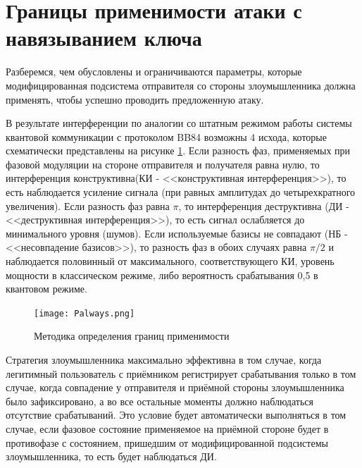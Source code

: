 \section{Границы применимости атаки с навязыванием ключа} \label{ch:ch3/sec2}

Разберемся, чем обусловлены и ограничиваются параметры, которые модифицированная подсистема отправителя со стороны злоумышленника должна применять, чтобы успешно проводить предложенную атаку. 

В результате интерференции по аналогии со штатным режимом работы системы квантовой коммуникации с протоколом BB84 возможны 4 исхода, которые схематически представлены на рисунке \ref{fig:Palways}. Если разность фаз, применяемых при фазовой модуляции на стороне отправителя и получателя равна нулю, то интерференция конструктивна(КИ - <<конструктивная интерференция>>), то есть наблюдается усиление сигнала (при равных амплитудах  до четырехкратного увеличения). Если разность фаз равна $\pi$, то интерференция деструктивна (ДИ - <<деструктивная интерференция>>), то есть сигнал ослабляется до минимального уровня (шумов). Если используемые базисы не совпадают (НБ - <<несовпадение базисов>>), то разность фаз в обоих случаях равна $\pi/2$ и наблюдается половинный от максимального, соответствующего КИ, уровень мощности в классическом режиме, либо вероятность срабатывания 0,5 в квантовом режиме. 


 \begin{figure}[ht]
  \centering
  \texttt{[image: Palways.png]}
  \caption{Методика определения границ применимости}
  \label{fig:Palways}
\end{figure}


Стратегия злоумышленника максимально эффективна в том случае, когда легитимный пользователь с приёмником регистрирует срабатывания только в том случае, когда совпадение у отправителя и приёмной стороны злоумышленника было зафиксировано, а во все остальные моменты должно наблюдаться отсутствие срабатываний. Это условие будет автоматически выполняться в том случае, если фазовое состояние применяемое на приёмной стороне будет в противофазе с состоянием, пришедшим от модифицированной подсистемы злоумышленника, то есть будет наблюдаться ДИ. 

